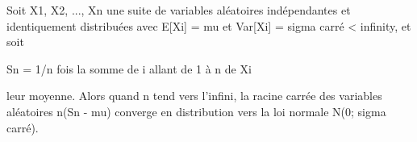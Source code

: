 \documentclass{article}
\begin{document}

Soit X1, X2, ..., Xn une suite de variables aléatoires
indépendantes et identiquement distribuées avec 
E[Xi] = mu et Var[Xi] = sigma carré < infinity, 
et soit

Sn = 1/n fois la somme de i allant de 1 à n de Xi

leur moyenne. Alors quand n tend vers l'infini,
la racine carrée des variables aléatoires n(Sn - mu)
converge en distribution vers la loi normale N(0; sigma carré).
\end{document}
